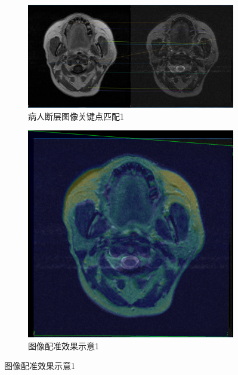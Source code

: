 \documentclass[a4paper, utf8]{ctexart}
\begin{document}
	\begin{figure}[htbp]
		\centering
		\begin{subfigure}{.6\textwidth}
			\centering
			\includegraphics[height=.13\textheight]{./figure/match_opencv_1.png}
			\caption{病人断层图像关键点匹配1}
		\end{subfigure}
		\begin{subfigure}{.3\textwidth}
			\centering
			\includegraphics[height=.13\textheight]{./figure/compare_opencv_1.png}
			\caption{图像配准效果示意1}
		\end{subfigure}
		

\end{figure}
\end{document}
